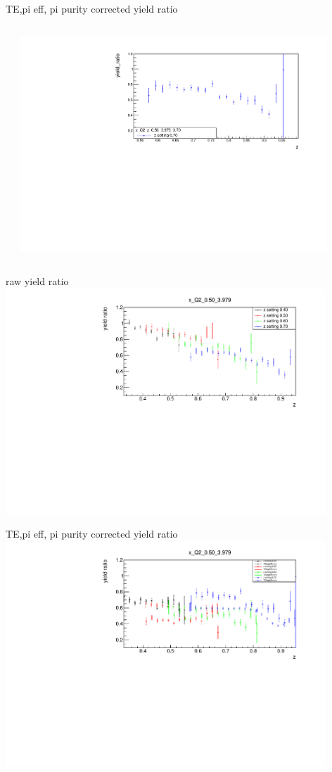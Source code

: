 \begin{frame}{TE,pi eff, pi purity corrected yield ratio}
\begin{columns}
\begin{column}[T]{0.5\textwidth}
\end{column}
\begin{column}[T]{0.5\textwidth}
\includegraphics[width = 0.9\textwidth]{results/yield/statistics_corr/x_Q2_z_0.50_3.979_0.70_ratio.pdf}
\end{column}
\end{columns}
\end{frame}
\begin{frame}{raw yield ratio}
\includegraphics[width = 0.9\textwidth]{results/yield/statistics/x_Q2_0.50_3.979_ratio.pdf}
\end{frame}
\begin{frame}{TE,pi eff, pi purity corrected yield ratio}
\includegraphics[width = 0.9\textwidth]{results/yield/statistics_corr/x_Q2_0.50_3.979_ratio.pdf}
\end{frame}
